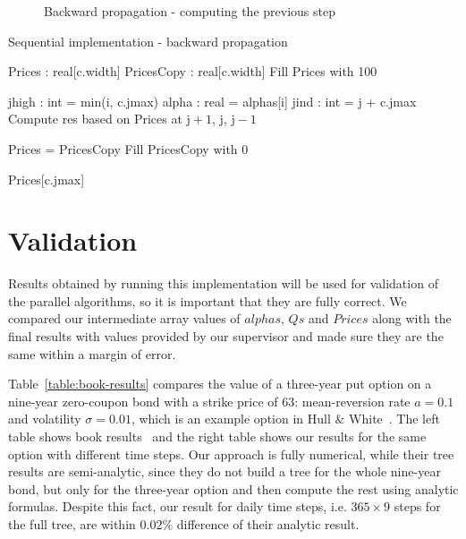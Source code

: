 \begin{figure}[H]
    \centering
    \def\svgwidth{0.5\textwidth}
	\caption{Backward propagation - computing the previous step}
    
	\label{fig:seqbackward}
\end{figure}

\begin{algorithm}[H]
    \DontPrintSemicolon
    \setcounter{AlgoLine}{44}
    \caption{Sequential implementation - backward propagation\label{alg:sequential-backward}}
    
    Prices : real[c.width]\;
    PricesCopy : real[c.width]\;
    Fill Prices with 100 
    \;
     {
        jhigh : int = min(i, c.jmax)\;
        alpha : real = alphas[i]\;
        \;
         {
            jind : int = j + c.jmax\;
            Compute res based on Prices at $\text{j}+1$, j, $\text{j}-1$\;
            \;
        }
        
        Prices = PricesCopy\;
        Fill PricesCopy with 0\;
    }
    \;
    \Return Prices[c.jmax]
\end{algorithm}

\section{Validation}\label{section:sequential:validation}

Results obtained by running this implementation will be used for validation of the parallel algorithms, so it is important that they are fully correct. We compared our intermediate array values of $\mathit{alphas}$, $\mathit{Qs}$ and $Prices$ along with the final results with values provided by our supervisor and made sure they are the same within a margin of error.

Table~\ref{table:book-results} compares the value of a three-year put option on a nine-year zero-coupon bond with a strike price of 63: mean-reversion rate $a = 0.1$ and volatility $\sigma = 0.01$, which is an example option in Hull \& White~\cite[pg. 706]{ofod}. The left table shows book results~\cite[pg. 707]{ofod} and the right table shows our results for the same option with different time steps. Our approach is fully numerical, while their tree results are semi-analytic, since they do not build a tree for the whole nine-year bond, but only for the three-year option and then compute the rest using analytic formulas. Despite this fact, our result for daily time steps, i.e. $365 \times 9$ steps for the full tree, are within $0.02\%$ difference of their analytic result.

